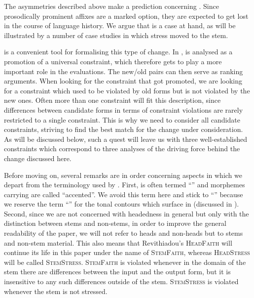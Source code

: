 \documentclass[output=paper,nonflat,colorlinks,citecolor=brown,newtxmath]{langsci/langscibook}
\begin{document}
The asymmetries described above make a prediction concerning . Since prosodically prominent  affixes are a marked option, they are expected to get lost in the course of language history. We argue that  is a case at hand, as will be illustrated by a number of case studies in which stress moved to the stem.

 is a convenient tool for formalising this type of change. In ,  is analysed as a promotion of a universal constraint, which therefore gets to play a more important role in the evaluations. The new/old pairs can then serve as ranking arguments. When looking for the constraint that got promoted, we are looking for a constraint which used to be violated by old forms but is not violated by the new ones. Often more than one constraint will fit this description, since differences between candidate forms in terms of constraint violations are rarely restricted to a single constraint. This is why we need to consider all candidate constraints, striving to find the best match for the change under consideration. As will be discussed below, such a quest will leave us with three well-established constraints which correspond to three analyses of the driving force behind the change discussed here.

Before moving on, several remarks are in order concerning aspects in which we depart from the terminology used by \citet{Revithiadou1999}. First,  is often termed ``'' and morphemes carrying  are called ``accented''. We avoid this term here and stick to ``'' because we reserve the term ``'' for the tonal contours which surface in  (discussed in ). Second, since we are not concerned with headedness in general but only with the distinction between stems and non-stems, in order to improve the general readability of the paper, we will not refer to heads and non-heads but to stems and non-stem material. This also means that Revithiadou's \textsc{HeadFaith} will continue its life in this paper under the name of \textsc{StemFaith}, whereas  \textsc{HeadStress} will be called \textsc{StemStress}. \textsc{StemFaith} is violated whenever in the domain of the stem there are differences between the input and the output form, but it is insensitive to any such differences outside of the stem. \textsc{StemStress} is violated whenever the stem is not stressed.
\end{document}
